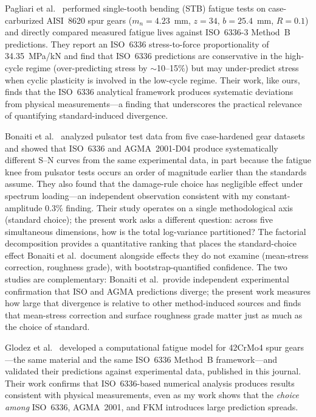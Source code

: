 \documentclass[12pt,a4paper]{article}
\begin{document}
Pagliari et al.~\cite{pagliari2025} performed single-tooth bending (STB)
fatigue tests on case-carburized AISI~8620 spur gears
($m_n{=}4.23$~mm, $z{=}34$, $b{=}25.4$~mm, $R{=}0.1$) and directly
compared measured fatigue lives against ISO~6336-3 Method~B predictions.
They report an ISO~6336 stress-to-force proportionality of
34.35~MPa/kN and find that ISO~6336 predictions are conservative in the
high-cycle regime (over-predicting stress by $\sim$10--15\%) but may
under-predict stress when cyclic plasticity is involved in the low-cycle
regime. Their work, like ours, finds that the ISO~6336 analytical
framework produces systematic deviations from physical measurements---a
finding that underscores the practical relevance of quantifying
standard-induced divergence.

Bonaiti et al.~\cite{bonaiti2024} analyzed pulsator test data from five
case-hardened gear datasets and showed that ISO~6336 and AGMA~2001-D04
produce systematically different S--N curves from the same experimental
data, in part because the fatigue knee from pulsator tests occurs an
order of magnitude earlier than the standards assume. They also found
that the damage-rule choice has negligible effect under spectrum
loading---an independent observation consistent with my constant-amplitude
0.3\% finding. Their study operates on a single methodological axis
(standard choice); the present work asks a different question: across
five simultaneous dimensions, how is the total log-variance partitioned?
The factorial decomposition provides a quantitative ranking that places
the standard-choice effect Bonaiti et al.\ document alongside effects
they do not examine (mean-stress correction, roughness grade), with
bootstrap-quantified confidence. The two studies are complementary:
Bonaiti et al.\ provide independent experimental confirmation that
ISO and AGMA predictions diverge; the present work measures how large
that divergence is relative to other method-induced sources and finds
that mean-stress correction and surface roughness grade matter just as
much as the choice of standard.

Glodez et al.~\cite{glodez2002} developed a computational fatigue
model for 42CrMo4 spur gears---the same material and the same
ISO~6336 Method~B framework---and validated their predictions against
experimental data, published in this journal. Their work confirms that
ISO~6336-based numerical analysis produces results consistent with
physical measurements, even as my work shows that the \emph{choice
among} ISO~6336, AGMA~2001, and FKM introduces large prediction spreads.
\end{document}
